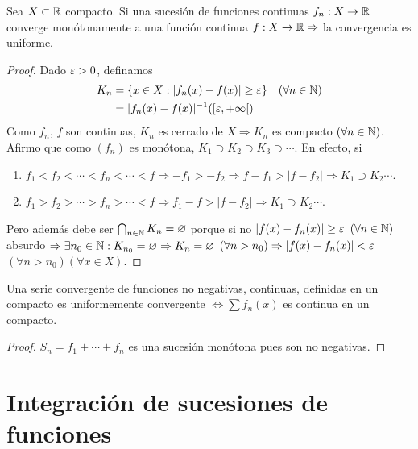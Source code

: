 \begin{theorem}
  Sea \(X \subset \mathbb{R} \) compacto. Si una sucesión de funciones continuas \(f_n: X \to \mathbb{R} \) converge monótonamente a una función continua \(f: X \to \mathbb{R} \Rightarrow \) la convergencia es uniforme.
  \begin{proof}
    Dado \(\varepsilon > 0\), definamos
    \begin{align*}
      K_n & = \{ x \in X : |f_n(x) - f(x)| \geq \e \} \quad (\forall n \in \N) \\
          & = |f_n(x) - f(x)|^{-1}(\interval[open right]{\e}{+\infty})
    \end{align*}
    Como \(f_n\), \(f\) son continuas, \(K_n\) es cerrado de \(X \Rightarrow K_n\) es compacto \((\forall n \in \mathbb{N})\). Afirmo que como \((f_n)\) es monótona,
    \(K_1 \supset K_2 \supset K_3 \supset \cdots \).
    En efecto, si \begin{enumerate}
      \item \(f_1 < f_2 < \cdots < f_n < \cdots < f \Rightarrow -f_1 > -f_2 \Rightarrow f - f_1 > |f - f_2| \Rightarrow K_1 \supset K_2 \cdots \).
      \item \(f_1 > f_2 > \cdots > f_n > \cdots < f \Rightarrow f_1 - f > |f - f_2| \Rightarrow K_1 \supset K_2 \cdots \).
    \end{enumerate}
    Pero además debe ser \(\bigcap_{n \in \mathbb{N}} K_n = \varnothing \) porque si no \(|f(x) - f_n(x)| \geq \varepsilon \) \((\forall n \in \mathbb{N})\) absurdo
    \(\Rightarrow \exists n_0 \in \mathbb{N} : K_{n_0} = \varnothing \Rightarrow K_n = \varnothing \) \((\forall n > n_0) \Rightarrow |f(x) - f_n(x)| < \varepsilon \) \((\forall n > n_0)(\forall x \in X)\).
  \end{proof}
\end{theorem}

\begin{corollary}
  Una serie convergente de funciones no negativas, continuas, definidas en un compacto es uniformemente convergente \(\iff \sum f_n(x)\) es continua en un compacto.
  \begin{proof}
    \(S_n = f_1 + \cdots + f_n\) es una sucesión monótona pues son no negativas.
  \end{proof}
\end{corollary}

\section{Integración de sucesiones de funciones}

